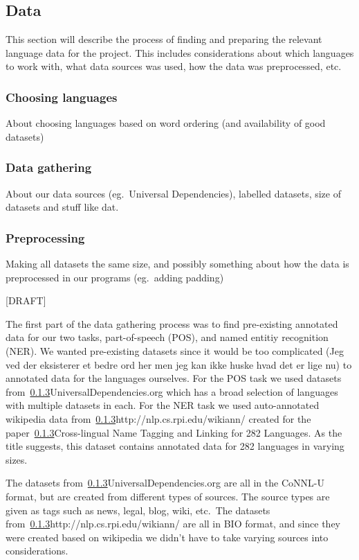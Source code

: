 

\subsection{Data}

This section will describe the process of finding and preparing the relevant
language data for the project. This includes considerations about which
languages to work with, what data sources was used, how the data was
preprocessed, etc.\


\subsubsection{Choosing languages}

About choosing languages based on word ordering (and availability of good
datasets)


\subsubsection{Data gathering}

About our data sources (eg.\ Universal Dependencies), labelled datasets, size of
datasets and stuff like dat.


\subsubsection{Preprocessing}

Making all datasets the same size, and possibly something about how the data is
preprocessed in our programs (eg.\ adding padding)


[DRAFT]

The first part of the data gathering process was to find pre-existing annotated data for our two tasks, part-of-speech (POS), and named entitiy recognition (NER).
We wanted pre-existing datasets since it would be {too complicated (Jeg ved der eksisterer et bedre ord her men jeg kan ikke huske hvad det er lige nu)} to annotated data for the languages ourselves.
For the POS task we used datasets from~\ref{}{UniversalDependencies.org} which has a broad selection of languages with multiple datasets in each.
For the NER task we used auto-annotated wikipedia data from~\ref{}{http://nlp.cs.rpi.edu/wikiann/} created for the paper~\ref{}{Cross-lingual Name Tagging and Linking for 282 Languages}.
As the title suggests, this dataset contains annotated data for 282 languages in varying sizes.

The datasets from~\ref{}{UniversalDependencies.org} are all in the CoNNL-U format, but are created from different types of sources. 
The source types are given as tags such as news, legal, blog, wiki, etc.\
The datasets from~\ref{}{http://nlp.cs.rpi.edu/wikiann/} are all in BIO format, and since they were created based on wikipedia we didn't have to take varying sources into considerations.


